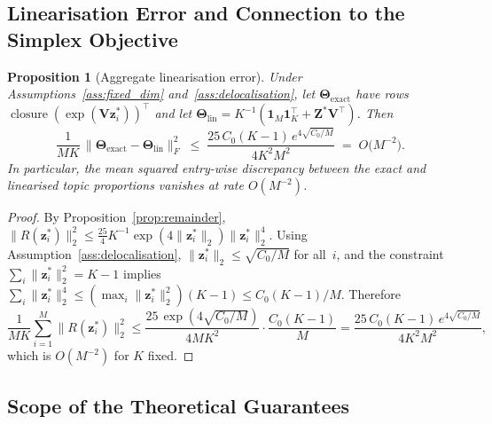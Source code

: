 \documentclass{article}
\newtheorem{proposition}[theorem]{Proposition}
\DeclareMathOperator{\closure}{closure}
\begin{document}
\subsection{Linearisation Error and Connection to the Simplex Objective}
\label{subsec:linearisation_error}

\begin{proposition}[Aggregate linearisation error]
\label{prop:linearisation_error}
Under Assumptions~\ref{ass:fixed_dim} and~\ref{ass:delocalisation},
let $\boldsymbol{\Theta}_{\mathrm{exact}}$ have rows
$\closure(\exp(\mathbf{V}\mathbf{z}_i^*))^{\!\top}$ and let
$\boldsymbol{\Theta}_{\mathrm{lin}}
= K^{-1}(\mathbf{1}_M\mathbf{1}_K^{\!\top}
+ \mathbf{Z}^*\mathbf{V}^{\!\top})$.
Then
\begin{equation}
  \frac{1}{MK}\,
  \bigl\|\boldsymbol{\Theta}_{\mathrm{exact}}
    - \boldsymbol{\Theta}_{\mathrm{lin}}\bigr\|_F^2
  \;\leq\;
  \frac{25\,C_0(K{-}1)\,e^{4\sqrt{C_0/M}}}{4K^2 M^2}
  \;=\;
  O\!\bigl(M^{-2}\bigr).
  \label{eq:linearisation_error}
\end{equation}
In particular, the mean squared entry-wise discrepancy between the exact
and linearised topic proportions vanishes at rate $O(M^{-2})$.
\end{proposition}

\begin{proof}
By Proposition~\ref{prop:remainder},
$\|R(\mathbf{z}_i^*)\|_2^2
 \leq \tfrac{25}{4}K^{-1}
      \exp(4\|\mathbf{z}_i^*\|_2)\|\mathbf{z}_i^*\|_2^4$.
Using Assumption~\ref{ass:delocalisation},
$\|\mathbf{z}_i^*\|_2 \leq \sqrt{C_0/M}$ for all~$i$, and the constraint
$\sum_i\|\mathbf{z}_i^*\|_2^2 = K{-}1$ implies
$\sum_i\|\mathbf{z}_i^*\|_2^4
 \leq (\max_i\|\mathbf{z}_i^*\|_2^2)(K{-}1)
 \leq C_0(K{-}1)/M$.
Therefore
\[
  \frac{1}{MK}\sum_{i=1}^M \|R(\mathbf{z}_i^*)\|_2^2
  \leq \frac{25\,\exp(4\sqrt{C_0/M})}{4MK^2}
       \cdot\frac{C_0(K{-}1)}{M}
  = \frac{25\,C_0(K{-}1)\,e^{4\sqrt{C_0/M}}}{4K^2 M^2},
\]
which is $O(M^{-2})$ for $K$ fixed.
\end{proof}

\subsection{Scope of the Theoretical Guarantees}
\label{subsec:scope}
\end{document}
